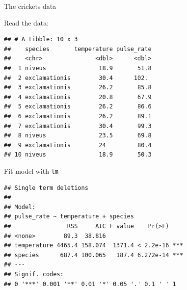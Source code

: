 \documentclass[
  ignorenonframetext,
]{beamer}
\newenvironment{Shaded}{\begin{snugshade}}{\end{snugshade}}
\newcommand{\DataTypeTok}[1]{\textcolor[rgb]{0.13,0.29,0.53}{#1}}
\newcommand{\DecValTok}[1]{\textcolor[rgb]{0.00,0.00,0.81}{#1}}
\newcommand{\FloatTok}[1]{\textcolor[rgb]{0.00,0.00,0.81}{#1}}
\newcommand{\KeywordTok}[1]{\textcolor[rgb]{0.13,0.29,0.53}{\textbf{#1}}}
\newcommand{\NormalTok}[1]{#1}
\newcommand{\OperatorTok}[1]{\textcolor[rgb]{0.81,0.36,0.00}{\textbf{#1}}}
\newcommand{\StringTok}[1]{\textcolor[rgb]{0.31,0.60,0.02}{#1}}
\begin{document}
\begin{frame}[fragile]{The crickets data}
\protect\hypertarget{the-crickets-data}{}

Read the data:

\small

\begin{Shaded}
\end{Shaded}

\begin{verbatim}
## # A tibble: 10 x 3
##    species       temperature pulse_rate
##    <chr>               <dbl>      <dbl>
##  1 niveus               18.9       51.8
##  2 exclamationis        30.4      102. 
##  3 exclamationis        26.2       85.8
##  4 exclamationis        20.8       67.9
##  5 exclamationis        26.2       86.6
##  6 exclamationis        26.2       89.1
##  7 exclamationis        30.4       99.3
##  8 niveus               23.5       69.8
##  9 exclamationis        24         80.4
## 10 niveus               18.9       50.3
\end{verbatim}

\normalsize

\end{frame}

\begin{frame}[fragile]{Fit model with \texttt{lm}}
\protect\hypertarget{fit-model-with-lm}{}

\begin{Shaded}
\end{Shaded}

\begin{verbatim}
## Single term deletions
## 
## Model:
## pulse_rate ~ temperature + species
##                RSS     AIC F value    Pr(>F)    
## <none>        89.3  38.816                      
## temperature 4465.4 158.074  1371.4 < 2.2e-16 ***
## species      687.4 100.065   187.4 6.272e-14 ***
## ---
## Signif. codes:  
## 0 '***' 0.001 '**' 0.01 '*' 0.05 '.' 0.1 ' ' 1
\end{verbatim}

\end{frame}
\end{document}
